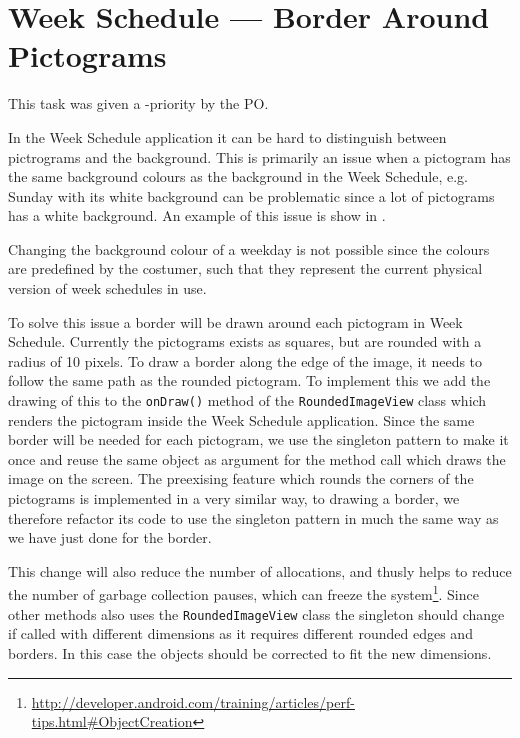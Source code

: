\section{Week Schedule --- Border Around Pictograms}
\begin{center}
\end{center}

This task was given a \phigh-priority by the PO. 

In the Week Schedule application it can be hard to distinguish between pictrograms and the background.
This is primarily an issue when a pictogram has the same background colours as the background in the Week Schedule, e.g. Sunday with its white background can be problematic since a lot of pictograms has a white background. 
An example of this issue is show in  .

Changing the background colour of a weekday is not possible since the colours are predefined by the costumer, such that they represent the current physical version of week schedules in use. 

To solve this issue a border will be drawn around each pictogram in Week Schedule.
Currently the pictograms exists as squares, but are rounded with a radius of 10 pixels.
To draw a border along the edge of the image, it needs to follow the same path as the rounded pictogram. 
To implement this we add the drawing of this to the \texttt{onDraw()} method of the \texttt{RoundedImageView} class which renders the pictogram inside the Week Schedule application. 
Since the same border will be needed for each pictogram, we use the singleton pattern to make it once and reuse the same object as argument for the method call which draws the image on the screen. 
The preexising feature which rounds the corners of the pictograms is implemented in a very similar way, to drawing a border, we therefore refactor its code to use the singleton pattern in much the same way as we have just done for the border. 

This change will also reduce the number of allocations, and  thusly helps to reduce the number of garbage collection pauses, which can freeze the system\footnote{\url{http://developer.android.com/training/articles/perf-tips.html\#ObjectCreation}}. 
Since other methods also uses the \texttt{RoundedImageView} class the singleton should change if called with different dimensions as it requires different rounded edges and borders. 
In this case the objects should be corrected to fit the new dimensions. 

